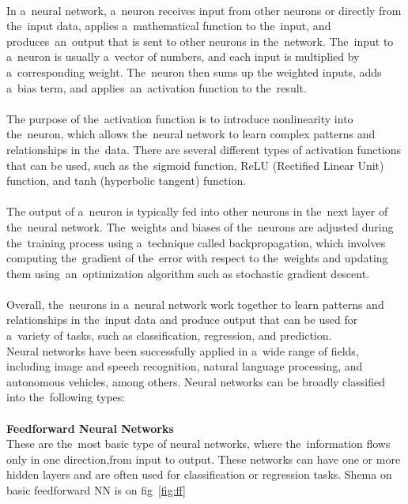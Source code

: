 \documentclass[12pt]{article}
\begin{document}
    \\
    In a~neural network, a~neuron receives input from other neurons or directly from the~input data, applies a~mathematical function to the~input, and produces~an~output that is sent to other neurons in the~network. The~input to a~neuron is usually a~vector of numbers, and each input is multiplied by a~corresponding weight. The~neuron then sums up the weighted inputs, adds a~bias term, and applies~an~activation function to the~result.\\
    \\
    The purpose of the~activation function is to introduce nonlinearity into the~neuron, which allows the~neural network to learn complex patterns and relationships in the~data. There are several different types of activation functions that can be used, such as the~sigmoid function, ReLU (Rectified Linear Unit) function, and tanh (hyperbolic tangent) function.\\
    \\
    The output of a~neuron is typically fed into other neurons in the~next layer of the~neural network. The~weights and biases of the~neurons are adjusted during the~training process using a~technique called backpropagation, which involves computing the~gradient of the~error with respect to the~weights and updating them using~an~optimization algorithm such as stochastic gradient descent.\\
    \\
    Overall, the~neurons in a~neural network work together to learn patterns and relationships in the~input data and produce output that can be used for a~variety of tasks, such as classification, regression, and prediction.\\
Neural networks have been successfully applied in a~wide range of fields, including image and speech recognition, natural language processing, and autonomous vehicles, among others. Neural networks can be broadly classified into the~following types:\\
    \\
    \textbf{Feedforward Neural Networks}\\
    These are the~most basic type of neural networks, where the~information flows only in one direction,from input to output. These networks can have one or more hidden layers and are often used for classification or regression tasks. Shema on basic feedforward NN is on fig~\ref{fig:ff}
\end{document}
